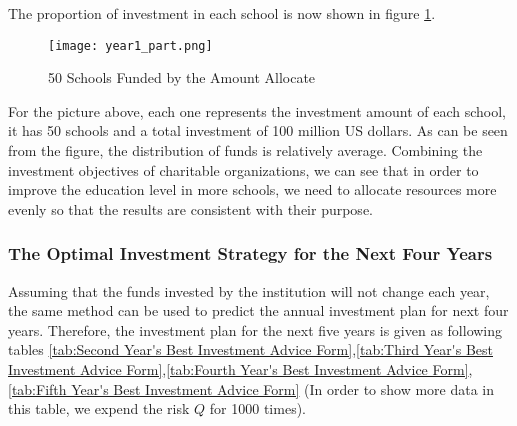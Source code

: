 \documentclass{mcmthesis}
\begin{document}
\par The proportion of investment in each school is now shown in figure \ref{50 Schools Funded by the Amount Allocate}.

\begin{figure}[!h]
\small
\centering
\texttt{[image: year1\_part.png]}
\caption{50 Schools Funded by the Amount Allocate} \label{50 Schools Funded by the Amount Allocate}
\end{figure}

\par For the picture above, each one represents the investment amount of each school, it has 50 schools and a total investment of 100 million US dollars. As can be seen from the figure, the distribution of funds is relatively average. Combining the investment objectives of charitable organizations, we can see that in order to improve the education level in more schools, we need to allocate resources more evenly so that the results are consistent with their purpose.

\subsubsection{The Optimal Investment Strategy for the Next Four Years}

\par Assuming that the funds invested by the institution will not change each year, the same method can be used to predict the annual investment plan for next four years. Therefore, the investment plan for the next five years is given as following tables \ref{tab:Second Year's Best Investment Advice Form},\ref{tab:Third Year's Best Investment Advice Form},\ref{tab:Fourth Year's Best Investment Advice Form},\ref{tab:Fifth Year's Best Investment Advice Form} (In order to show more data in this table, we expend the risk $Q$ for 1000 times).
\end{document}
